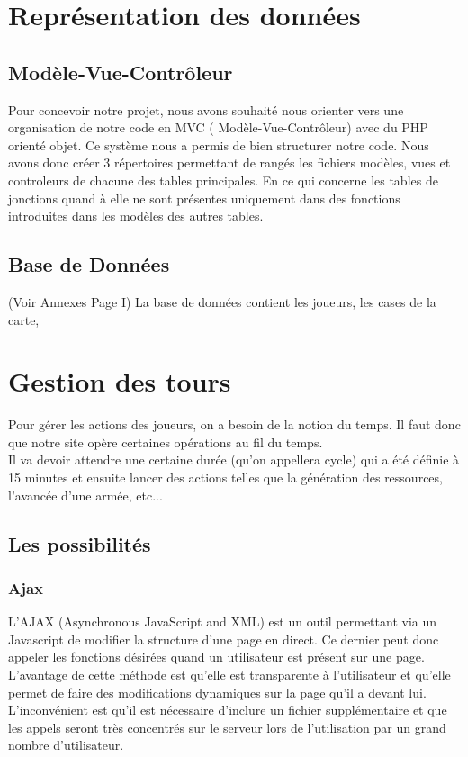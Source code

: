 \documentclass[11pt,a4paper]{article}
\begin{document}
\newpage\section{Représentation des données}
\subsection{Modèle-Vue-Contrôleur}
Pour concevoir notre projet, nous avons souhaité nous orienter vers une organisation de notre code en MVC ( Modèle-Vue-Contrôleur) avec du PHP orienté objet. Ce système nous a permis de bien structurer notre code. Nous avons donc créer 3 répertoires permettant de rangés les fichiers modèles, vues et controleurs de chacune des tables principales. En ce qui concerne les tables de jonctions quand à elle ne sont présentes uniquement dans des fonctions introduites dans les modèles des autres tables.
\subsection{Base de Données}
(Voir Annexes Page I)
La base de données contient les joueurs, les cases de la carte, 

\newpage\section{Gestion des tours}
Pour gérer les actions des joueurs, on a besoin de la notion du temps. Il faut donc que notre site opère certaines opérations au fil du temps. \\
Il va devoir attendre une certaine durée (qu'on appellera cycle) qui a été définie à 15 minutes et ensuite lancer des actions telles que la génération des ressources, l'avancée d'une armée, etc...\\
\subsection{Les possibilités}
\subsubsection{Ajax}
L'AJAX (Asynchronous JavaScript and XML) est un outil permettant via un Javascript de modifier la structure d'une page en direct. 
Ce dernier peut donc appeler les fonctions désirées quand un utilisateur est présent sur une page.\\
L'avantage de cette méthode est qu'elle est transparente à l'utilisateur et qu'elle permet de faire des modifications dynamiques sur la page qu'il a devant lui. \\
L'inconvénient est qu'il est nécessaire d'inclure un fichier supplémentaire et que les appels seront très concentrés sur le serveur lors de l'utilisation par un grand nombre d'utilisateur.\\
\end{document}
